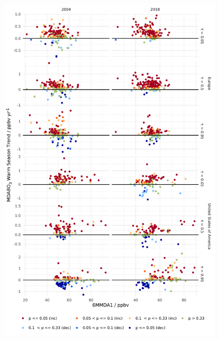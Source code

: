 \documentclass{article}
\begin{document}
\begin{figure}[p]
\centering
\includegraphics[height=0.75\textheight]{figures/si_figures/fS23_mda8_warm_sig_mda8_6mmda1.pdf}
\caption{}
\label{si_fig:mda8_warm_sig_mda8_6mmda1}
\end{figure}
\clearpage
\end{document}
